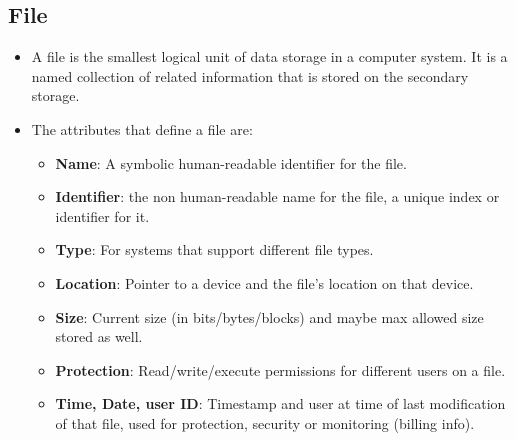 \documentclass{article}
\theoremstyle{plain}
\theoremstyle{definition}
\begin{document}
\subsection{File}
\begin{itemize}
    \item A file is the smallest logical unit of data storage in a computer system. It is a named collection of related information that is stored on the secondary storage. 
    
    \item The attributes that define a file are:
    \begin{itemize}
        \item \textbf{Name}: A symbolic human-readable identifier for the file. 
        
        \item \textbf{Identifier}: the non human-readable name for the file, a unique index or identifier for it. 
        
        \item \textbf{Type}: For systems that support different file types.
        
        \item \textbf{Location}: Pointer to a device and the file's location on that device.
        
        \item \textbf{Size}: Current size (in bits/bytes/blocks) and maybe max allowed size stored as well.
        
        \item \textbf{Protection}: Read/write/execute permissions for different users on a file. 
        
        \item \textbf{Time, Date, user ID}: Timestamp and user at time of last modification of that file, used for protection, security or monitoring (billing info). 
    \end{itemize}
\end{itemize}
\end{document}
